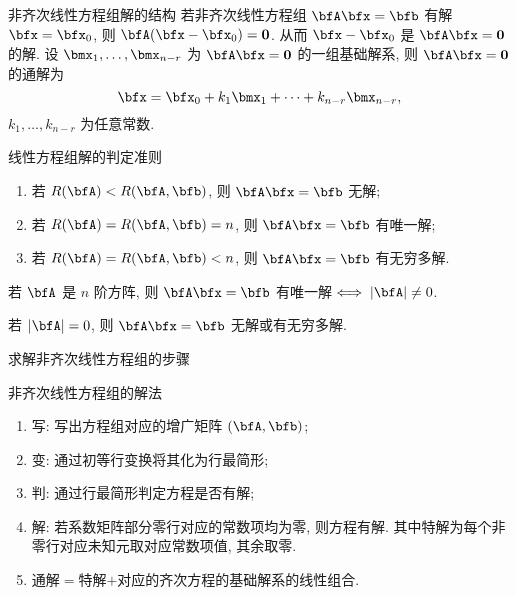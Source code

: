 \begin{frame}{非齐次线性方程组解的结构}
	\onslide<+->
	若非齐次线性方程组 $\bfA\bfx=\bfb$ 有解 $\bfx=\bfx_0$,
	则 $\bfA(\bfx-\bfx_0)={\bf0}$.
	\onslide<+->
	从而 $\bfx-\bfx_0$ 是 $\bfA\bfx={\bf0}$ 的解.
	\onslide<+->
	设 $\bmx_1,\dots,\bmx_{n-r}$ 为 $\bfA\bfx={\bf0}$ 的一组基础解系, 则 $\bfA\bfx={\bf0}$ 的通解为
	\[\bfx=\bfx_0+k_1\bmx_1+\cdots+k_{n-r}\bmx_{n-r},\]
	$k_1,\dots,k_{n-r}$ 为任意常数.

	\onslide<+->
	\begin{second}{线性方程组解的判定准则}
		\begin{enumerate}
			\item 若 $R(\bfA)<R(\bfA,\bfb)$, 则 $\bfA \bfx=\bfb$ 无解;
			\item 若 $R(\bfA)=R(\bfA,\bfb)=n$, 则 $\bfA \bfx=\bfb$ 有唯一解;
			\item 若 $R(\bfA)=R(\bfA,\bfb)<n$, 则 $\bfA \bfx=\bfb$ 有无穷多解.
		\end{enumerate}
	\end{second}
	\onslide<+->
	\begin{corollary}
		若 $\bfA$ 是 $n$ 阶方阵, 则 $\bfA\bfx=\bfb$ 有唯一解$\iff|\bfA|\neq0$.
	\end{corollary}
	\onslide<+->
	若 $|\bfA|=0$, 则 $\bfA\bfx=\bfb$ 无解或有无穷多解.
\end{frame}


\begin{frame}{求解非齐次线性方程组的步骤}
	\onslide<+->
	\begin{second}{非齐次线性方程组的解法}
		\begin{enumerate}
			\item 写: 写出方程组对应的增广矩阵 $(\bfA,\bfb)$;
			\item 变: 通过初等行变换将其化为行最简形;
			\item 判: 通过行最简形判定方程是否有解;
			\item 解: 若系数矩阵部分零行对应的常数项均为零, 则方程有解.
			其中特解为每个非零行对应未知元取对应常数项值, 其余取零.
			\item 通解$=$特解$+$对应的齐次方程的基础解系的线性组合.
		\end{enumerate}
	\end{second}
\end{frame}


